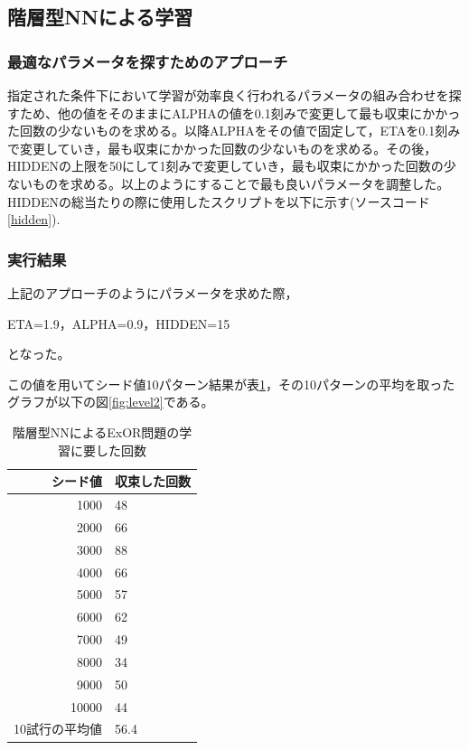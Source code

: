 \subsection{階層型NNによる学習}
\subsubsection{最適なパラメータを探すためのアプローチ}
指定された条件下において学習が効率良く行われるパラメータの組み合わせを探
すため、他の値をそのままにALPHAの値を0.1刻みで変更して最も収束にかかった回数の少ないものを求める。以降ALPHAをその値で固定して，ETAを0.1刻みで変更していき，最も収束にかかった回数の少ないものを求める。その後，HIDDENの上限を50にして1刻みで変更していき，最も収束にかかった回数の少ないものを求める。以上のようにすることで最も良いパラメータを調整した。HIDDENの総当たりの際に使用したスクリプトを以下に示す(ソースコード\ref{hidden}).



\subsubsection{実行結果}
上記のアプローチのようにパラメータを求めた際，

ETA=1.9，ALPHA=0.9，HIDDEN=15

となった。

この値を用いてシード値10パターン結果が表\ref{table:level2}，その10パターンの平均を取ったグラフが以下の図\ref{fig:level2}である。

\begin{table}[htb]
 \begin{center}
  \caption{階層型NNによるExOR問題の学習に要した回数}
  \label{table:level2}
  \begin{tabular}[htb]{r|l} \hline
   シード値 & 収束した回数 \\ \hline \hline
   1000 & 48 \\ \hline
   2000 & 66 \\ \hline
   3000 & 88 \\ \hline
   4000 & 66 \\ \hline
   5000 & 57 \\ \hline
   6000 & 62 \\ \hline
   7000 & 49 \\ \hline
   8000 & 34 \\ \hline
   9000 & 50 \\ \hline
   10000 & 44 \\ \hline \hline
   10試行の平均値 & 56.4 \\ \hline
  \end{tabular}
 \end{center}
\end{table}

